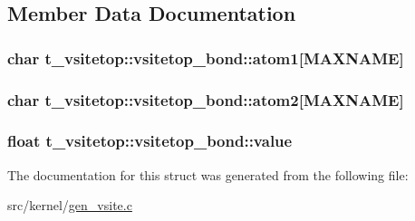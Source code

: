 \subsection{\-Member \-Data \-Documentation}
\hypertarget{structt__vsitetop_1_1vsitetop__bond_a1d8e8324cf0126ebca5e2238cee1310e}{
\subsubsection[{atom1}]{\setlength{\rightskip}{0pt plus 5cm}char {\bf t\-\_\-vsitetop\-::vsitetop\-\_\-bond\-::atom1}\mbox{[}{\bf \-M\-A\-X\-N\-A\-M\-E}\mbox{]}}}\label{structt__vsitetop_1_1vsitetop__bond_a1d8e8324cf0126ebca5e2238cee1310e}
\hypertarget{structt__vsitetop_1_1vsitetop__bond_a269e7bd57c0d2a65b8d490f1e9198c24}{
\subsubsection[{atom2}]{\setlength{\rightskip}{0pt plus 5cm}char {\bf t\-\_\-vsitetop\-::vsitetop\-\_\-bond\-::atom2}\mbox{[}{\bf \-M\-A\-X\-N\-A\-M\-E}\mbox{]}}}\label{structt__vsitetop_1_1vsitetop__bond_a269e7bd57c0d2a65b8d490f1e9198c24}
\hypertarget{structt__vsitetop_1_1vsitetop__bond_a1e8342f8d04cf921a01749c1faeb13f0}{
\subsubsection[{value}]{\setlength{\rightskip}{0pt plus 5cm}float {\bf t\-\_\-vsitetop\-::vsitetop\-\_\-bond\-::value}}}\label{structt__vsitetop_1_1vsitetop__bond_a1e8342f8d04cf921a01749c1faeb13f0}


\-The documentation for this struct was generated from the following file\-:\begin{DoxyCompactItemize}
\item 
src/kernel/\hyperlink{gen__vsite_8c}{gen\-\_\-vsite.\-c}\end{DoxyCompactItemize}
